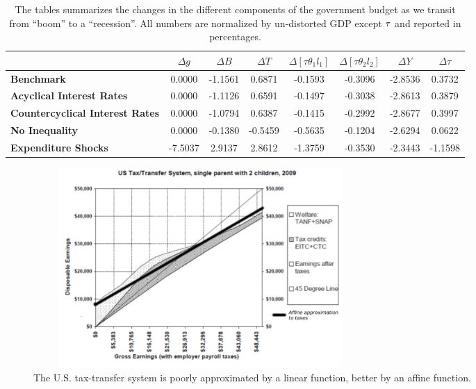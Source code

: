 \documentclass[thmsb,11pt]{article}
\begin{document}
\newpage
\begin{table}[htp]
\begin{tabular}{|l|c|c|c|c|c|c|c|}
\hline
& \textbf{$\Delta g$} & \textbf{$\Delta B$} & \textbf{$\Delta T$} & \textbf{$%
\Delta [\tau\theta_1l_1]$} & \textbf{$\Delta [\tau\theta_2l_2]$} & \textbf{$%
\Delta Y$} & \textbf{$\Delta \tau$} \\ \hline
\textbf{Benchmark} & 0.0000 & -1.1561 & 0.6871 & -0.1593 & -0.3096 & -2.8536
& 0.3732 \\ \hline
\textbf{Acyclical Interest Rates} & 0.0000 & -1.1126 & 0.6591 & -0.1497 &
-0.3038 & -2.8613 & 0.3879 \\ \hline
\textbf{Countercyclical Interest Rates} & 0.0000 & -1.0794 & 0.6387 & -0.1415 &
-0.2992 & -2.8677 & 0.3997 \\ \hline
\textbf{No Inequality} & 0.0000 & -0.1380 & -0.5459 & -0.5635 & -0.1204 &
-2.6294 & 0.0622 \\ \hline
\textbf{Expenditure Shocks} & -7.5037 & 2.9137 & 2.8612 & -1.3759 & -0.3530 & -2.3443 &
-1.1598 \\ \hline
\end{tabular}%
\caption{The tables summarizes the changes in the different components of the government budget as we transit from ``boom'' to a ``recession''.  All numbers are normalized by un-distorted GDP except $\protect\tau $ and reported in percentages.
}

\label{tab:ShortRunPolicyResponses}
\end{table}

\newpage

 \begin{figure}[htp]
 \centering
 \includegraphics[width=5in,height=3in]{Draft25Graphs/affine_taxes.pdf}
 \caption{ The U.S. tax-transfer system is poorly approximated by a linear function, better by an affine
function.}
 \label{fig:affine_taxes}
 \end{figure}
\end{document}

